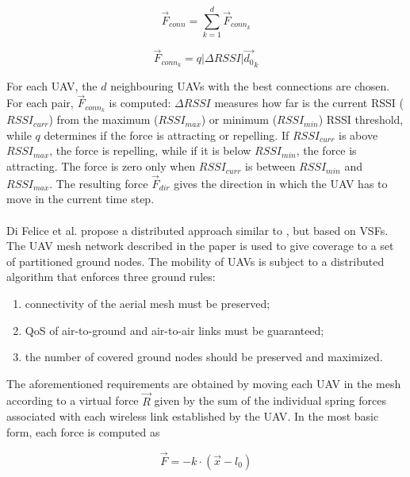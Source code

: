 \begin{equation}
	\overrightarrow{F}_{conn} = \sum\limits_{k=1}^{d} \overrightarrow{F}_{conn_k}
\end{equation} 

\begin{equation}
	\overrightarrow{F}_{conn_k} = q |\Delta RSSI| \overrightarrow{d_0}_k
\end{equation}

For each \gls{UAV}, the $d$ neighbouring \glspl{UAV} with the best connections are chosen. For each pair, $\overrightarrow{F}_{conn_k}$ is computed: $\Delta RSSI$ measures how far is the current RSSI ($RSSI_{curr}$) from the maximum ($RSSI_{max}$) or minimum ($RSSI_{min}$) RSSI threshold, while $q$ determines if the force is attracting or repelling. If $RSSI_{curr}$ is above $RSSI_{max}$, the force is repelling, while if it is below $RSSI_{min}$, the force is attracting. The force is zero only when $RSSI_{curr}$ is between $RSSI_{min}$ and $RSSI_{max}$. The resulting force $\overrightarrow{F}_{dir}$ gives the direction in which the \gls{UAV} has to move in the current time step. \\ \\
Di Felice et al. \cite{ref:soa-plac-distr2} propose a distributed approach similar to \cite{ref:soa-plac-distr1}, but based on \glspl{VSF}. The \gls{UAV} mesh network described in the paper is used to give coverage to a set of partitioned ground nodes. The mobility of \glspl{UAV} is subject to a distributed algorithm that enforces three ground rules: 

\begin{enumerate}[label=(\roman*)]
	\item connectivity of the aerial mesh must be preserved;
	\item QoS of air-to-ground and air-to-air links must be guaranteed;
	\item the number of covered ground nodes should be preserved and maximized.
\end{enumerate}

The aforementioned requirements are obtained by moving each \gls{UAV} in the mesh according to a virtual force $\overrightarrow{R}$ given by the sum of the individual spring forces associated with each wireless link established by the \gls{UAV}. In the most basic form, each force is computed as

\begin{equation}
	\overrightarrow{F} = -k \cdot (\overrightarrow{x} - l_0)
\end{equation} 

